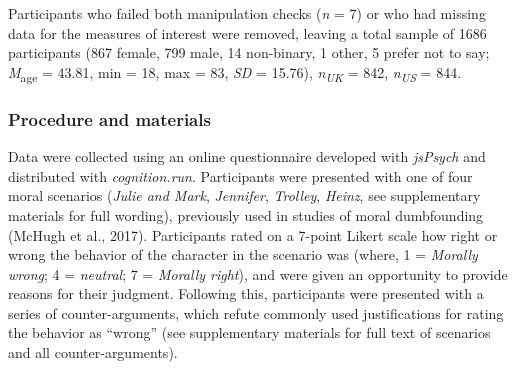 \documentclass[
  man,floatsintext]{apa6}
\begin{document}
Participants who failed both manipulation checks (\emph{n} = 7) or who had missing data for the measures of interest were removed, leaving a total sample of 1686 participants (867 female, 799 male, 14 non-binary, 1 other, 5 prefer not to say; \emph{M}\textsubscript{age} = 43.81, min = 18, max = 83, \emph{SD} = 15.76), \emph{n\textsubscript{UK}} = 842, \emph{n\textsubscript{US}} = 844.

\hypertarget{procedure-and-materials}{%
\subsubsection{Procedure and materials}\label{procedure-and-materials}}

Data were collected using an online questionnaire developed with \emph{jsPsych} and distributed with \emph{cognition.run}. Participants were presented with one of four moral scenarios (\emph{Julie and Mark}, \emph{Jennifer}, \emph{Trolley}, \emph{Heinz}, see supplementary materials for full wording), previously used in studies of moral dumbfounding (McHugh et al., 2017). Participants rated on a 7-point Likert scale how right or wrong the behavior of the character in the scenario was (where, 1 = \emph{Morally wrong}; 4 = \emph{neutral}; 7 = \emph{Morally right}), and were given an opportunity to provide reasons for their judgment. Following this, participants were presented with a series of counter-arguments, which refute commonly used justifications for rating the behavior as ``wrong'' (see supplementary materials for full text of scenarios and all counter-arguments).
\end{document}

